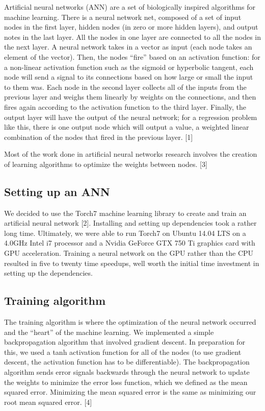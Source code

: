 \documentclass{article}
\begin{document}
Artificial neural networks (ANN) are a set of biologically inspired algorithms
for machine learning.  There is a neural network net, composed of a set of input
 nodes in the first layer, hidden nodes (in zero or more hidden layers), and output
  notes in the last layer. All the nodes in one layer are connected to all the nodes 
  in the next layer.  A neural network takes in a vector as input (each node takes an 
  element of the vector).  Then, the nodes “fire” based on an activation function: 
  for a non-linear activation function such as the sigmoid or hyperbolic tangent, 
  each node will send a signal to its connections based on how large or small the 
  input to them was.  Each node in the second layer collects all of the inputs from 
  the previous layer and weighs them linearly by weights on the connections, and then
   fires again according to the activation function to the third layer.  Finally, 
   the output layer will have the output of the neural network; for a regression 
   problem like this, there is one output node which will output a value, a 
   weighted linear combination of the nodes that fired in the previous layer. [1]

Most of the work done in artificial neural networks research
 involves the creation of
 learning algorithms to optimize the weights between nodes.  [3]
 

\subsection{Setting up an ANN}

We decided to use the Torch7 machine learning library to create and 
train an artificial neural network [2].  Installing and
 setting up dependencies took a rather long time.  Ultimately, we were
  able to run Torch7 on Ubuntu 14.04 LTS on a 4.0GHz Intel i7 processor
   and a Nvidia GeForce GTX 750 Ti graphics card with GPU acceleration. 
    Training a neural network on the GPU rather than the CPU resulted in
     five to twenty time speedups, well worth the initial time investment
      in setting up the dependencies.


\subsection{Training algorithm}
The training algorithm is where the optimization of the neural network
 occurred and the ``heart'' of the machine learning.  We implemented 
 a simple backpropagation algorithm that involved gradient descent.  In 
 preparation for this, we used a tanh activation function for all of the
  nodes (to use gradient descent, the activation function has to be differentiable). 
   The backpropagation algorithm sends error signals backwards through the neural
    network to update the weights to minimize the error loss function, which we
     defined as the mean squared error.  Minimizing the mean squared error is
      the same as minimizing our root mean squared error. [4]
\end{document}
